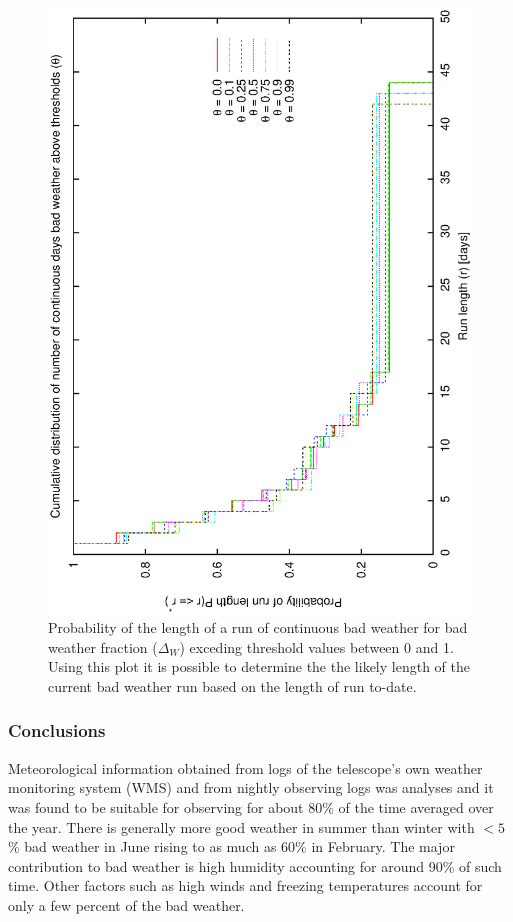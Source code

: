{{\begin{figure}[htbp]
\begin{center}
    \includegraphics[scale=0.4, angle=-90]{figures/ecs/run_len_thresh.eps}
\end{center}
\caption[Cumulative probability of lengths of bad weather runs for variable threshold value.]
{Probability of the length of a run of continuous bad weather for bad weather fraction ($\Delta_W$) exceding threshold values between 0 and 1. Using this plot it is possible to determine the the likely length of the current bad weather run based on the length of run to-date.}
\label{fig:ecs_run_len}
\end{figure}



\subsubsection{Conclusions}
Meteorological information obtained from logs of the telescope's own weather monitoring system (WMS) and from nightly observing logs was analyses and it was found to be suitable for observing for about 80\% of the time averaged over the year. There is generally more good weather in summer than winter with $<5$\% bad weather in June rising to as much as 60\% in February. The major contribution to bad weather is high humidity accounting for around 90\% of such time. Other factors such as high winds and freezing temperatures account for only a few percent of the bad weather. 

}}
